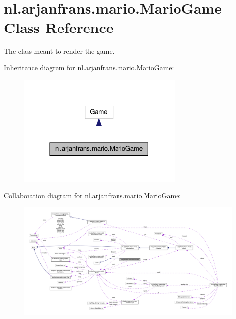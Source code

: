 \hypertarget{classnl_1_1arjanfrans_1_1mario_1_1MarioGame}{}\section{nl.\+arjanfrans.\+mario.\+Mario\+Game Class Reference}
\label{classnl_1_1arjanfrans_1_1mario_1_1MarioGame}


The class meant to render the game.  




Inheritance diagram for nl.\+arjanfrans.\+mario.\+Mario\+Game\+:\nopagebreak
\begin{figure}[H]
\begin{center}
\leavevmode
\includegraphics[width=230pt]{classnl_1_1arjanfrans_1_1mario_1_1MarioGame__inherit__graph}
\end{center}
\end{figure}


Collaboration diagram for nl.\+arjanfrans.\+mario.\+Mario\+Game\+:
\nopagebreak
\begin{figure}[H]
\begin{center}
\leavevmode
\includegraphics[width=350pt]{classnl_1_1arjanfrans_1_1mario_1_1MarioGame__coll__graph}
\end{center}
\end{figure}

